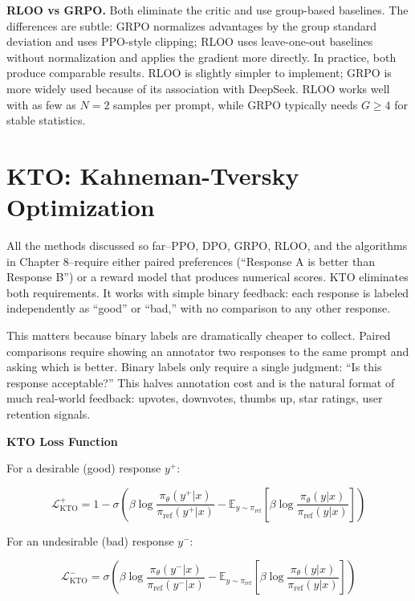 \begin{chapterenv}
\begin{tipbox}
\textbf{RLOO vs GRPO.} Both eliminate the critic and use group-based baselines. The differences are subtle: GRPO normalizes advantages by the group standard deviation and uses PPO-style clipping; RLOO uses leave-one-out baselines without normalization and applies the gradient more directly. In practice, both produce comparable results. RLOO is slightly simpler to implement; GRPO is more widely used because of its association with DeepSeek. RLOO works well with as few as $N = 2$ samples per prompt, while GRPO typically needs $G \geq 4$ for stable statistics.
\end{tipbox}

\section{KTO: Kahneman-Tversky Optimization}

All the methods discussed so far--PPO, DPO, GRPO, RLOO, and the algorithms in Chapter 8--require either paired preferences (``Response A is better than Response B'') or a reward model that produces numerical scores. KTO eliminates both requirements. It works with simple binary feedback: each response is labeled independently as ``good'' or ``bad,'' with no comparison to any other response.

This matters because binary labels are dramatically cheaper to collect. Paired comparisons require showing an annotator two responses to the same prompt and asking which is better. Binary labels only require a single judgment: ``Is this response acceptable?'' This halves annotation cost and is the natural format of much real-world feedback: upvotes, downvotes, thumbs up, star ratings, user retention signals.

\begin{infobox}
\textbf{KTO Loss Function}

For a desirable (good) response $y^+$:

$$\mathcal{L}_{\text{KTO}}^{+} = 1 - \sigma\!\left(\beta \log \frac{\pi_\theta(y^+|x)}{\pi_{\text{ref}}(y^+|x)} - \mathbb{E}_{y \sim \pi_{\text{ref}}}\!\left[\beta \log \frac{\pi_\theta(y|x)}{\pi_{\text{ref}}(y|x)}\right]\right)$$

For an undesirable (bad) response $y^-$:

$$\mathcal{L}_{\text{KTO}}^{-} = \sigma\!\left(\beta \log \frac{\pi_\theta(y^-|x)}{\pi_{\text{ref}}(y^-|x)} - \mathbb{E}_{y \sim \pi_{\text{ref}}}\!\left[\beta \log \frac{\pi_\theta(y|x)}{\pi_{\text{ref}}(y|x)}\right]\right)$$


\end{infobox}
\end{chapterenv}
